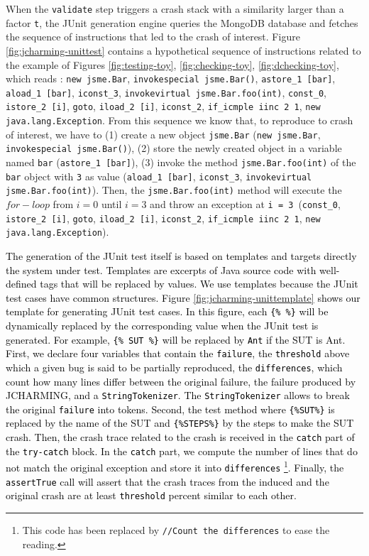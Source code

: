 \documentclass[times, doublespace]{smrauth}
\newcommand{\red}[1]{\textcolor{black}{#1}}
\begin{document}
{When the {\tt validate} step triggers a crash stack with a similarity larger than a factor {\tt t}, the JUnit generation engine queries the MongoDB database and fetches the sequence of instructions that led to the crash of interest.
Figure \ref{fig:jcharming-unittest} contains a hypothetical sequence
of instructions related to the example of Figures \ref{fig:testing-toy},
\ref{fig:checking-toy}, \ref{fig:dchecking-toy}, which reads : {\tt new jsme.Bar},
 {\tt invokespecial jsme.Bar()}, {\tt astore\_1 [bar]}, {\tt aload\_1 [bar]},
  {\tt iconst\_3}, {\tt invokevirtual jsme.Bar.foo(int)}, {\tt const\_0},
  {\tt istore\_2 [i]}, {\tt goto}, {\tt iload\_2 [i]}, {\tt iconst\_2},
  {\tt if\_icmple iinc 2 1}, {\tt new java.lang.Exception}.
From this sequence we know that, to reproduce to crash of interest, we have
to (1) create a new object {\tt jsme.Bar} ({\tt new jsme.Bar},
{\tt invokespecial jsme.Bar()}), (2) store the newly created object in a
variable named {\tt bar} ({\tt astore\_1 [bar]}), (3) invoke the method
{\tt jsme.Bar.foo(int)} of the {\tt bar} object with {\tt 3} as value
({\tt aload\_1 [bar]}, {\tt iconst\_3}, {\tt invokevirtual jsme.Bar.foo(int)}).
Then, the {\tt jsme.Bar.foo(int)} method will execute the $for-loop$ from $i=0$ until $i=3$ and
throw an exception at {\tt i = 3}~({\tt const\_0}, {\tt istore\_2 [i]}, {\tt goto},
{\tt iload\_2 [i]}, {\tt iconst\_2}, {\tt if\_icmple iinc 2 1}, {\tt new java.lang.Exception}).

\red{The generation of the JUnit test itself is based on templates and targets directly
the system under test. Templates are excerpts of Java source code with well-defined
tags that will be replaced by values. We use templates because the
JUnit test cases have common structures.
Figure \ref{fig:jcharming-unittemplate} shows our template for generating JUnit
test cases. In this figure, each {\tt \{\% \%\}} will be dynamically replaced by
the corresponding value when the JUnit test is generated. For example, {\tt \{\% SUT \%\}}
will be replaced by {\tt Ant} if the SUT is Ant.
First, we declare four variables that contain the {\tt failure},
the {\tt threshold} above which a given bug is said to be partially reproduced,
the {\tt differences}, which count how many lines differ between the original
failure, the failure produced by JCHARMING, and a {\tt StringTokenizer}.
The {\tt StringTokenizer} allows to break the original {\tt failure} into
tokens. Second, the test method where {\tt \{\%SUT\%\}} is replaced by the name
of the SUT and {\tt \{\%STEPS\%\}} by the steps to make the SUT crash.
Then, the crash trace related to the crash is received in the {\tt catch} part of
the {\tt try-catch} block. In the {\tt catch} part, we compute the number of lines
that do not match the original exception and store it into {\tt differences}
\footnote{This code has been replaced by {\tt //Count the differences} to ease the
reading.}. Finally, the {\tt assertTrue} call will assert that
the crash traces from the induced and the original crash are at least {\tt threshold}
 percent similar to each other.}


}
\end{document}
